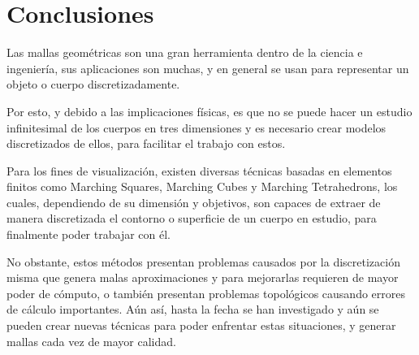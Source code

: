 \chapter{Conclusiones}
\label{ch:conclusiones}

Las mallas geométricas son una gran herramienta dentro de la ciencia e ingeniería, sus 
aplicaciones son muchas, y en general se usan para representar un objeto o cuerpo 
discretizadamente.

Por esto, y debido a las implicaciones físicas, es que no se puede hacer un estudio 
infinitesimal de los cuerpos en tres dimensiones y es necesario crear modelos discretizados de 
ellos, para facilitar el trabajo con estos.

Para los fines de visualización, existen diversas técnicas basadas en elementos finitos 
como Marching Squares, Marching Cubes y Marching Tetrahedrons, los cuales, dependiendo de 
su dimensión y objetivos, son capaces de extraer de manera discretizada el contorno o superficie 
de un cuerpo en estudio, para finalmente poder trabajar con él.

No obstante, estos métodos presentan problemas causados por la discretización misma que 
genera malas aproximaciones y para mejorarlas requieren de mayor poder de cómputo, o también 
presentan problemas topológicos causando errores de cálculo importantes. Aún así, hasta la fecha 
se han investigado y aún se pueden crear nuevas técnicas para poder enfrentar estas situaciones, y 
generar mallas cada vez de mayor calidad.
